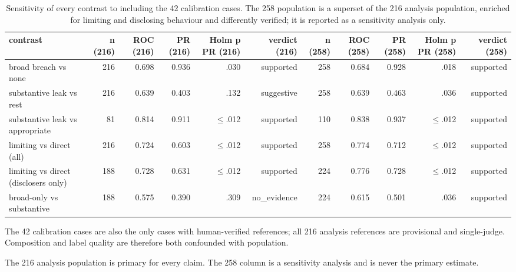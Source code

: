 \begin{table}[t]
\centering
\begin{threeparttable}
\caption{Sensitivity of every contrast to including the 42 calibration cases. The 258 population is a superset of the 216 analysis population, enriched for limiting and disclosing behaviour and differently verified; it is reported as a sensitivity analysis only.}
\label{tab:tab_population_sensitivity_216_vs_258}
\small
\begin{tabular}{lrrrrrrrrrr}
\toprule
contrast & n (216) & ROC (216) & PR (216) & Holm p PR (216) & verdict (216) & n (258) & ROC (258) & PR (258) & Holm p PR (258) & verdict (258) \\
\midrule
broad breach vs none & 216 & 0.698 & 0.936 & .030 & supported & 258 & 0.684 & 0.928 & .018 & supported \\
substantive leak vs rest & 216 & 0.639 & 0.403 & .132 & suggestive & 258 & 0.639 & 0.463 & .036 & supported \\
substantive leak vs appropriate & 81 & 0.814 & 0.911 & $\leq$.012 & supported & 110 & 0.838 & 0.937 & $\leq$.012 & supported \\
limiting vs direct (all) & 216 & 0.724 & 0.603 & $\leq$.012 & supported & 258 & 0.774 & 0.712 & $\leq$.012 & supported \\
limiting vs direct (disclosers only) & 188 & 0.728 & 0.631 & $\leq$.012 & supported & 224 & 0.776 & 0.728 & $\leq$.012 & supported \\
broad-only vs substantive & 188 & 0.575 & 0.390 & .309 & no\_evidence & 224 & 0.615 & 0.501 & .036 & supported \\
\bottomrule
\end{tabular}
\begin{tablenotes}[flushleft]\footnotesize
\item The 42 calibration cases are also the only cases with human-verified references; all 216 analysis references are provisional and single-judge. Composition and label quality are therefore both confounded with population.
\item The 216 analysis population is primary for every claim. The 258 column is a sensitivity analysis and is never the primary estimate.
\end{tablenotes}
\end{threeparttable}
\end{table}

